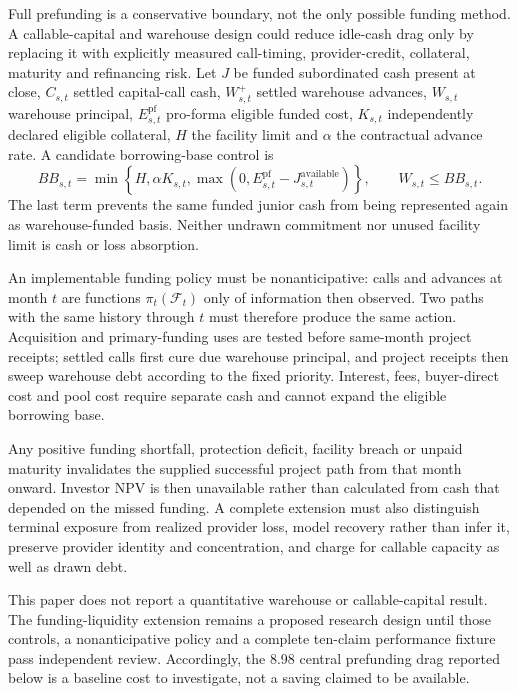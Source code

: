 \documentclass[11pt,a4paper]{article}
\begin{document}
Full prefunding is a conservative boundary, not the only possible funding method. A callable-capital and warehouse design could reduce idle-cash drag only by replacing it with explicitly measured call-timing, provider-credit, collateral, maturity and refinancing risk. Let \(J\) be funded subordinated cash present at close, \(C_{s,t}\) settled capital-call cash, \(W^+_{s,t}\) settled warehouse advances, \(W_{s,t}\) warehouse principal, \(E_{s,t}^{\mathrm{pf}}\) pro-forma eligible funded cost, \(K_{s,t}\) independently declared eligible collateral, \(H\) the facility limit and \(\alpha\) the contractual advance rate. A candidate borrowing-base control is
\begin{equation}
BB_{s,t}=\min\!\left\{H,\alpha K_{s,t},\max\!\left(0,E_{s,t}^{\mathrm{pf}}-J_{s,t}^{\mathrm{available}}\right)\right\},
\qquad W_{s,t}\leq BB_{s,t}.
\label{eq:warehouse-bb}
\end{equation}
The last term prevents the same funded junior cash from being represented again as warehouse-funded basis. Neither undrawn commitment nor unused facility limit is cash or loss absorption.

An implementable funding policy must be nonanticipative: calls and advances at month \(t\) are functions \(\pi_t(\mathcal F_t)\) only of information then observed. Two paths with the same history through \(t\) must therefore produce the same action. Acquisition and primary-funding uses are tested before same-month project receipts; settled calls first cure due warehouse principal, and project receipts then sweep warehouse debt according to the fixed priority. Interest, fees, buyer-direct cost and pool cost require separate cash and cannot expand the eligible borrowing base.

Any positive funding shortfall, protection deficit, facility breach or unpaid maturity invalidates the supplied successful project path from that month onward. Investor NPV is then unavailable rather than calculated from cash that depended on the missed funding. A complete extension must also distinguish terminal exposure from realized provider loss, model recovery rather than infer it, preserve provider identity and concentration, and charge for callable capacity as well as drawn debt.

This paper does not report a quantitative warehouse or callable-capital result. The funding-liquidity extension remains a proposed research design until those controls, a nonanticipative policy and a complete ten-claim performance fixture pass independent review. Accordingly, the 8.98 central prefunding drag reported below is a baseline cost to investigate, not a saving claimed to be available.
\end{document}
